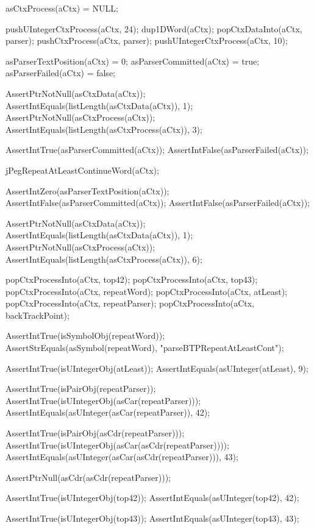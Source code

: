 \startCTest
  asCtxProcess(aCtx) = NULL;
  
  pushUIntegerCtxProcess(aCtx, 24);
  dup1DWord(aCtx);
  popCtxDataInto(aCtx, parser);
  pushCtxProcess(aCtx, parser);
  pushUIntegerCtxProcess(aCtx, 10);
  
  asParserTextPosition(aCtx) = 0;
  asParserCommitted(aCtx)    = true;
  asParserFailed(aCtx)       = false;
  
  AssertPtrNotNull(asCtxData(aCtx));
  AssertIntEquals(listLength(asCtxData(aCtx)), 1);
  AssertPtrNotNull(asCtxProcess(aCtx));
  AssertIntEquals(listLength(asCtxProcess(aCtx)), 3);
  
  AssertIntTrue(asParserCommitted(aCtx));
  AssertIntFalse(asParserFailed(aCtx));
  
  jPegRepeatAtLeastContinueWord(aCtx);
  
  AssertIntZero(asParserTextPosition(aCtx));
  AssertIntFalse(asParserCommitted(aCtx));
  AssertIntFalse(asParserFailed(aCtx));
  
  AssertPtrNotNull(asCtxData(aCtx));
  AssertIntEquals(listLength(asCtxData(aCtx)), 1);
  AssertPtrNotNull(asCtxProcess(aCtx));
  AssertIntEquals(listLength(asCtxProcess(aCtx)), 6);
  
  popCtxProcessInto(aCtx, top42);
  popCtxProcessInto(aCtx, top43);
  popCtxProcessInto(aCtx, repeatWord);
  popCtxProcessInto(aCtx, atLeast);
  popCtxProcessInto(aCtx, repeatParser);
  popCtxProcessInto(aCtx, backTrackPoint);
  
  AssertIntTrue(isSymbolObj(repeatWord));
  AssertStrEquals(asSymbol(repeatWord), "parseBTPRepeatAtLeastCont");
  
  AssertIntTrue(isUIntegerObj(atLeast));
  AssertIntEquals(asUInteger(atLeast), 9);
  
  AssertIntTrue(isPairObj(repeatParser));
  AssertIntTrue(isUIntegerObj(asCar(repeatParser)));
  AssertIntEquals(asUInteger(asCar(repeatParser)), 42);
  
  AssertIntTrue(isPairObj(asCdr(repeatParser)));
  AssertIntTrue(isUIntegerObj(asCar(asCdr(repeatParser))));
  AssertIntEquals(asUInteger(asCar(asCdr(repeatParser))), 43);
  
  AssertPtrNull(asCdr(asCdr(repeatParser)));
  
  AssertIntTrue(isUIntegerObj(top42));
  AssertIntEquals(asUInteger(top42), 42);  

  AssertIntTrue(isUIntegerObj(top43));
  AssertIntEquals(asUInteger(top43), 43);
  
